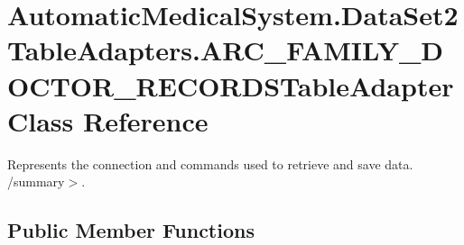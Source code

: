 \section{AutomaticMedicalSystem.DataSet2TableAdapters.ARC\_\-FAMILY\_\-DOCTOR\_\-RECORDSTableAdapter Class Reference}
\label{class_automatic_medical_system_1_1_data_set2_table_adapters_1_1_a_r_c___f_a_m_i_l_y___d_o_c_t_o_r___r_e_c_o_r_d_s_table_adapter}
Represents the connection and commands used to retrieve and save data. /summary$>$.  


\subsection*{Public Member Functions}

